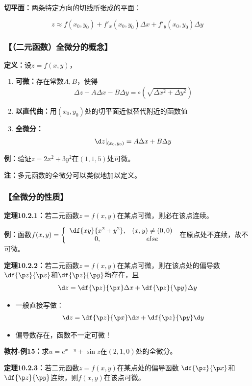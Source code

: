 {\bf 切平面：}两条特定方向的切线所张成的平面：

$$z\approx f(x_0,y_0)+f'_x(x_0,y_0)\Delta x+f'_y(x_0,y_0)\Delta y$$

\subsubsection{【（二元函数）全微分的概念】}

{\bf 定义：}设$z=f(x,y)$，
\begin{enumerate}[(1)]
  \setlength{\itemindent}{1cm}
  \item {\bf 可微：}存在常数$A,B$，使得
  $${\Delta z-A\Delta x-B\Delta y=\circ(\sqrt{\Delta x^2+\Delta y^2})}$$
  \item {\bf 以直代曲：}用$(x_0,y_0)$处的切平面近似替代附近的函数值
  \item {\bf 全微分：}$${\d z|_{(x_0,y_0)}=A\Delta x+B\Delta y}$$
\end{enumerate}

{\bf 例：}验证$z=2x^2+3y^2$在$(1,1,5)$处可微。

{\bf 注：}多元函数的全微分可以类似地加以定义。

\subsubsection{【全微分的性质】}

{\bf 定理10.2.1：}若二元函数$z=f(x,y)$在某点可微，则必在该点连续。

{\bf 例：}函数$f(x,y)=\left\{\begin{array}{cc}
	\df{xy}{x^2+y^2},& (x,y)\ne (0,0)\\
	0, & else
\end{array}\right.$
在原点处不连续，故不可微。

{\bf 定理10.2.2：}若二元函数$z=f(x,y)$在某点可微，则在该点处的偏导数
$\df{\p z}{\p x}$和$\df{\p z}{\p y}$均存在，且
$$\d z=\df{\p z}{\p x}\Delta x+\df{\p z}{\p y}\Delta y$$

\begin{itemize}
  \item 一般直接写做：
  $${\d z=\df{\p z}{\p x}\d x+\df{\p z}{\p y}\d y}$$ 
  \item 偏导数存在，函数不一定可微！
\end{itemize}

{\bf 教材-例15：}求$u=e^{x-y}+\sin z$在$(2,1,0)$处的全微分。

{\bf 定理10.2.3：}若二元函数$z=f(x,y)$在某点处的偏导函数
$\df{\p z}{\p x}$和$\df{\p z}{\p y}$连续，则$f(x,y)$在该点可微。

